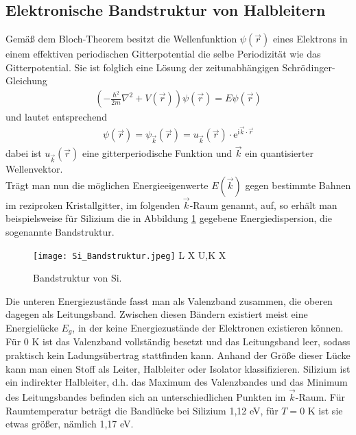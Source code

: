 \subsection{Elektronische Bandstruktur von Halbleitern}
Gemäß dem Bloch-Theorem besitzt die Wellenfunktion $\psi(\vec{r})$ eines Elektrons in einem effektiven periodischen Gitterpotential die selbe Periodizität wie das Gitterpotential. Sie ist folglich eine Lösung der zeitunabhängigen Schrödinger-Gleichung
\begin{align}
\left(-\frac{\hbar^2}{2m}\nabla^2+V(\vec{r})\right)\psi(\vec{r})=E\psi(\vec{r})
\end{align}
und lautet entsprechend
\begin{align}
\psi(\vec{r})=\psi_{\vec{k}}(\vec{r})=u_{\vec{k}}(\vec{r})\cdot \mathrm{e}^{\mathrm{i}\vec{k}\cdot \vec{r}}
\end{align}
dabei ist $u_{\vec{k}}(\vec{r})$ eine gitterperiodische Funktion und $\vec{k}$ ein quantisierter Wellenvektor.\\
Trägt man nun die möglichen Energieeigenwerte $E(\vec{k})$ gegen bestimmte Bahnen im reziproken Kristallgitter, im folgenden $\vec{k}$-Raum genannt, auf, so erhält man beispielsweise für Silizium die in Abbildung \ref{fig:Si_bandstructure} gegebene Energiedispersion, die sogenannte Bandstruktur.
\begin{figure}[h]
\begin{center}
\texttt{[image: Si\_Bandstruktur.jpeg]}
L \hspace{1cm} \Gamma \hspace{1cm} X \hspace{1cm} U,K \hspace{1cm} X \hspace{1cm} \Gamma
\caption{Bandstruktur von Si. \cite{lit:Iba09}}
\label{fig:Si_bandstructure}
\end{center}
\end{figure}
Die unteren Energiezustände fasst man als Valenzband zusammen, die oberen dagegen als Leitungsband. Zwischen diesen Bändern existiert meist eine Energielücke $E_g$, in der keine Energiezustände der Elektronen existieren können. 
Für 0 K ist das Valenzband vollständig besetzt und das Leitungsband leer, sodass praktisch kein Ladungsübertrag stattfinden kann. 
Anhand der Größe dieser Lücke kann man einen Stoff als Leiter, Halbleiter oder Isolator klassifizieren. Silizium ist ein indirekter Halbleiter, d.h. das Maximum des Valenzbandes und das Minimum des Leitungsbandes befinden sich an unterschiedlichen Punkten im $\vec{k}$-Raum. Für Raumtemperatur beträgt die Bandlücke bei Silizium 1,12 eV, für $T=0$ K ist sie etwas größer, nämlich 1,17 eV.\\
